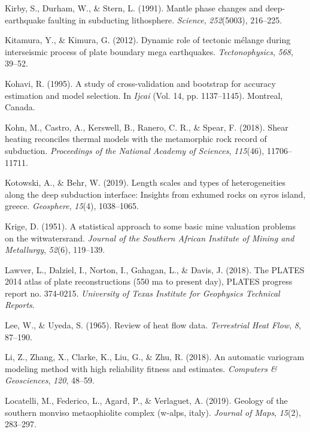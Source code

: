 \begin{CSLReferences}{1}{1}
\leavevmode{}%
Kirby, S., Durham, W., \& Stern, L. (1991). Mantle phase changes and deep-earthquake faulting in subducting lithosphere. \emph{Science}, \emph{252}(5003), 216--225.

\leavevmode{}%
Kitamura, Y., \& Kimura, G. (2012). Dynamic role of tectonic m{é}lange during interseismic process of plate boundary mega earthquakes. \emph{Tectonophysics}, \emph{568}, 39--52.

\leavevmode{}%
Kohavi, R. (1995). A study of cross-validation and bootstrap for accuracy estimation and model selection. In \emph{Ijcai} (Vol. 14, pp. 1137--1145). Montreal, Canada.

\leavevmode{}%
Kohn, M., Castro, A., Kerswell, B., Ranero, C. R., \& Spear, F. (2018). Shear heating reconciles thermal models with the metamorphic rock record of subduction. \emph{Proceedings of the National Academy of Sciences}, \emph{115}(46), 11706--11711.

\leavevmode{}%
Kotowski, A., \& Behr, W. (2019). Length scales and types of heterogeneities along the deep subduction interface: Insights from exhumed rocks on syros island, greece. \emph{Geosphere}, \emph{15}(4), 1038--1065.

\leavevmode{}%
Krige, D. (1951). A statistical approach to some basic mine valuation problems on the witwatersrand. \emph{Journal of the Southern African Institute of Mining and Metallurgy}, \emph{52}(6), 119--139.

\leavevmode{}%
Lawver, L., Dalziel, I., Norton, I., Gahagan, L., \& Davis, J. (2018). The PLATES 2014 atlas of plate reconstructions (550 ma to present day), PLATES progress report no. 374-0215. \emph{University of Texas Institute for Geophysics Technical Reports}.

\leavevmode{}%
Lee, W., \& Uyeda, S. (1965). Review of heat flow data. \emph{Terrestrial Heat Flow}, \emph{8}, 87--190.

\leavevmode{}%
Li, Z., Zhang, X., Clarke, K., Liu, G., \& Zhu, R. (2018). An automatic variogram modeling method with high reliability fitness and estimates. \emph{Computers \& Geosciences}, \emph{120}, 48--59.

\leavevmode{}%
Locatelli, M., Federico, L., Agard, P., \& Verlaguet, A. (2019). Geology of the southern monviso metaophiolite complex (w-alps, italy). \emph{Journal of Maps}, \emph{15}(2), 283--297.


\end{CSLReferences}
